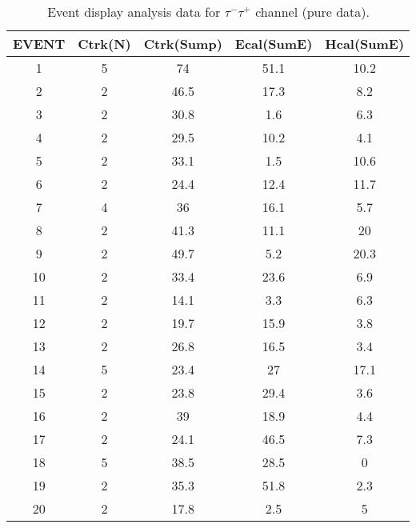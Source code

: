 \begin{table}[h!]
    \centering
    \caption{Event display analysis data for $\tau^-\tau^+$ channel (pure data).}
    \begin{tabular}{|ccccc|}
    \hline
    EVENT & Ctrk(N) & Ctrk(Sump) & Ecal(SumE) & Hcal(SumE) \\ \hline
    1     & 5       & 74         & 51.1       & 10.2       \\
    2     & 2       & 46.5       & 17.3       & 8.2        \\
    3     & 2       & 30.8       & 1.6        & 6.3        \\
    4     & 2       & 29.5       & 10.2       & 4.1        \\
    5     & 2       & 33.1       & 1.5        & 10.6       \\
    6     & 2       & 24.4       & 12.4       & 11.7       \\
    7     & 4       & 36         & 16.1       & 5.7        \\
    8     & 2       & 41.3       & 11.1       & 20         \\
    9     & 2       & 49.7       & 5.2        & 20.3       \\
    10    & 2       & 33.4       & 23.6       & 6.9        \\
    11    & 2       & 14.1       & 3.3        & 6.3        \\
    12    & 2       & 19.7       & 15.9       & 3.8        \\
    13    & 2       & 26.8       & 16.5       & 3.4        \\
    14    & 5       & 23.4       & 27         & 17.1       \\
    15    & 2       & 23.8       & 29.4       & 3.6        \\
    16    & 2       & 39         & 18.9       & 4.4        \\
    17    & 2       & 24.1       & 46.5       & 7.3        \\
    18    & 5       & 38.5       & 28.5       & 0          \\
    19    & 2       & 35.3       & 51.8       & 2.3        \\
    20    & 2       & 17.8       & 2.5        & 5         \\ \hline
    \end{tabular}
    \label{table:ed-tt}
\end{table}
    
